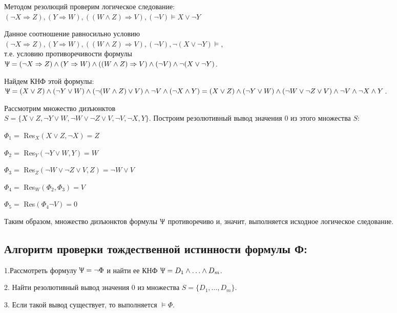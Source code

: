 \begin{example}
    Методом резолюций проверим логическое следование: \\
    $(\lnot X\Rightarrow Z),(Y\Rightarrow W),((W\land Z)\Rightarrow V), (\lnot V) \models X \lor \lnot Y$

    Данное соотношение равносильно условию \\
    $(\lnot X\Rightarrow Z),(Y\Rightarrow W),((W\land Z)\Rightarrow V), (\lnot V), \lnot (X\lor\lnot Y)\models$, \\т.е. условию противоречивости формулы \\
    $\Uppsi = (\lnot X\Rightarrow Z)\land(Y\Rightarrow W)\land((W\land Z)\Rightarrow V)\land (\lnot V)\land \lnot (X\lor\lnot Y)$.

    Найдем КНФ этой формулы:
    $\Uppsi=(X\lor Z)\land(\lnot Y\lor W)\land (\lnot(W\land Z)\lor V)\land\lnot V\land(\lnot X\land Y) = (X\lor Z)\land(\lnot Y\lor W)\land(\lnot W\lor\lnot Z\lor V)\land\lnot V\land\lnot X\land Y$.

    Рассмотрим множество дизъюнктов \\
    $S = \{X\lor Z,\lnot Y\lor W,\lnot W\lor\lnot Z\lor V,\lnot V,\lnot X, Y\}$. Построим резолютивный вывод значения 0 из этого множества $S$:

    $\Phi_1 = $ Res$_X(X\lor Z,\lnot X) = Z$

    $\Phi_2 = $ Res$_Y(\lnot Y\lor W,Y) = W$

    $\Phi_3 = $ Res$_Z(\lnot W\lor\lnot Z\lor V, Z) = \lnot W \lor V$

    $\Phi_4 = $ Res$_W(\Phi_2,\Phi_3) = V$

    $\Phi_5 = $ Res$(\Phi_4\lnot V) = 0$

    Таким образом, множество дизъюнктов формулы $\Uppsi$ противоречиво и, значит, выполняется исходное логическое следование.
\end{example}

\subsection*{Алгоритм проверки тождественной истинности формулы Ф:}
1.Рассмотреть формулу $\Uppsi=\lnot \Phi$ и найти ее КНФ $\Uppsi = D_1\land\ldots\land D_m$.

2. Найти резолютивный вывод значения 0 из множества $S = \{D_1,\ldots,D_m\}$.

3. Если такой вывод существует, то выполняется $\models\Phi$.

